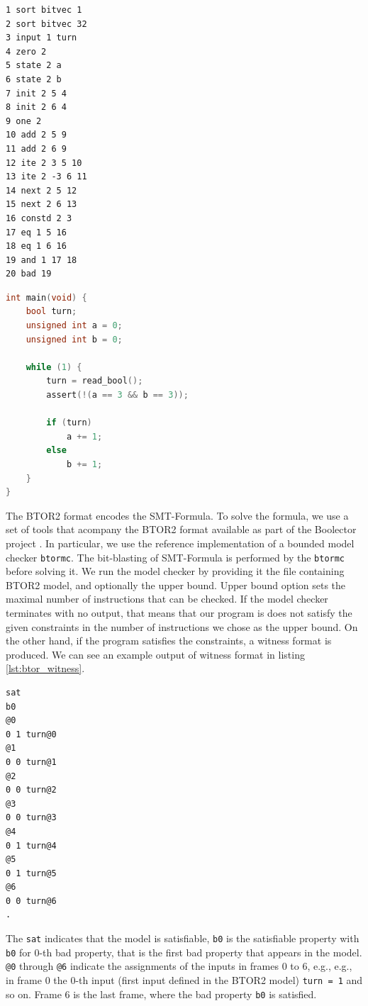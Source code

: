 \documentclass[12pt]{article}
\begin{document}
\begin{lstlisting}[label=lst:btor2_example, caption={Example BTOR2 model for \texttt{C} code in listing \ref{lst:c_code}},captionpos=b]
1 sort bitvec 1
2 sort bitvec 32
3 input 1 turn
4 zero 2
5 state 2 a
6 state 2 b
7 init 2 5 4
8 init 2 6 4
9 one 2
10 add 2 5 9
11 add 2 6 9
12 ite 2 3 5 10
13 ite 2 -3 6 11
14 next 2 5 12
15 next 2 6 13
16 constd 2 3
17 eq 1 5 16
18 eq 1 6 16
19 and 1 17 18
20 bad 19
\end{lstlisting}


\newpage
\begin{lstlisting}[label=lst:c_code, language=c, caption={\texttt{C} code we generate a model from},captionpos=b]
int main(void) {
    bool turn;
    unsigned int a = 0;
    unsigned int b = 0;

    while (1) {
        turn = read_bool();
        assert(!(a == 3 && b == 3));

        if (turn)
            a += 1;
        else
            b += 1;
    }
}
\end{lstlisting}

The BTOR2 format encodes the SMT-Formula. To solve the formula, we use a set of
tools that acompany the BTOR2 format available as part of the Boolector project
\cite{DBLP:journals/jsat/NiemetzPB14}. In particular, we use the reference
implementation of a bounded model checker \texttt{btormc}. The bit-blasting of 
SMT-Formula is performed by the \texttt{btormc} before solving it. We run the
model checker by providing it the file containing BTOR2 model, and optionally
the upper bound. Upper bound option sets the maximal number of instructions
that can be checked. If the model checker terminates with no output, that means
that our program is does not satisfy the given constraints in the number of
instructions we chose as the upper bound. On the other hand, if the program
satisfies the constraints, a witness format is produced. We can see an example
output of witness format in listing \ref{lst:btor_witness}.

\begin{lstlisting}[label=lst:btor_witness, caption={BTOR2 Witness Format for model in listing \ref{lst:btor2_example}}, captionpos=b]
sat
b0
@0
0 1 turn@0
@1
0 0 turn@1
@2
0 0 turn@2
@3
0 0 turn@3
@4
0 1 turn@4
@5
0 1 turn@5
@6
0 0 turn@6
.
\end{lstlisting}

The \texttt{sat} indicates that the model is satisfiable, \texttt{b0} is the 
satisfiable property with \texttt{b0} for 0-th bad property, that is the first
bad property that appears in the model. \texttt{@0} through \texttt{@6}
indicate the assignments of the inputs in frames 0 to 6, e.g., e.g., in frame
0 the 0-th input (first input defined in the BTOR2 model) \texttt{turn = 1} and
so on. Frame 6 is the last frame, where the bad property \texttt{b0} is
satisfied.
\end{document}
